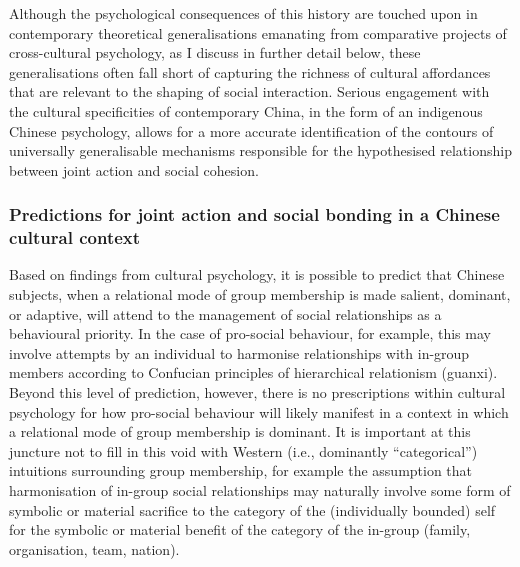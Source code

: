 {Although the psychological consequences of this history are touched upon in contemporary theoretical generalisations emanating from comparative projects of cross-cultural psychology, as I discuss in further detail below, these generalisations often fall short of capturing the richness of cultural affordances that are relevant to the shaping of social interaction.  Serious engagement with the cultural specificities of contemporary China, in the form of an indigenous Chinese psychology, allows for a more accurate identification of the contours of universally generalisable mechanisms responsible for the hypothesised relationship between joint action and social cohesion.




  \subsubsection{Predictions for joint action and social bonding in a Chinese cultural context}


  Based on findings from cultural psychology, it is possible to predict that Chinese subjects, when a relational mode of group membership is made salient, dominant, or adaptive, will attend to the management of social relationships as a behavioural priority.  In the case of pro-social behaviour, for example, this may involve attempts by an individual to harmonise relationships with in-group members according to Confucian principles of hierarchical relationism (guanxi).  Beyond this level of prediction, however, there is no prescriptions within cultural psychology for how pro-social behaviour will likely manifest in a context in which a relational mode of group membership is dominant.  It is important at this juncture not to fill in this void with Western (i.e., dominantly ``categorical'') intuitions surrounding group membership, for example the assumption that harmonisation of in-group social relationships may naturally involve some form of symbolic or material sacrifice to the category of the (individually bounded) self for the symbolic or material benefit of the category of the in-group (family, organisation, team, nation).

}
